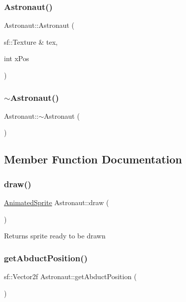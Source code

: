 \subsubsection{\texorpdfstring{Astronaut()}{Astronaut()}}
{\footnotesize\ttfamily Astronaut\+::\+Astronaut (\begin{DoxyParamCaption}\item[{sf\+::\+Texture \&}]{tex,  }\item[{int}]{x\+Pos }\end{DoxyParamCaption})}

\mbox{\label{class_astronaut_af31f9de205719a042df5f0a1879ee064}} 
\subsubsection{\texorpdfstring{$\sim$\+Astronaut()}{~Astronaut()}}
{\footnotesize\ttfamily Astronaut\+::$\sim$\+Astronaut (\begin{DoxyParamCaption}{ }\end{DoxyParamCaption})}



\subsection{Member Function Documentation}
\mbox{\label{class_astronaut_a0dca06c39c27c2f451de64bbc1785d0a}} 
\subsubsection{\texorpdfstring{draw()}{draw()}}
{\footnotesize\ttfamily \hyperlink{class_animated_sprite}{Animated\+Sprite} Astronaut\+::draw (\begin{DoxyParamCaption}{ }\end{DoxyParamCaption})}

Returns sprite ready to be drawn \mbox{\label{class_astronaut_a7b30fc496f4f8bb28770b05c641222a1}} 
\subsubsection{\texorpdfstring{get\+Abduct\+Position()}{getAbductPosition()}}
{\footnotesize\ttfamily sf\+::\+Vector2f Astronaut\+::get\+Abduct\+Position (\begin{DoxyParamCaption}{ }\end{DoxyParamCaption})}

